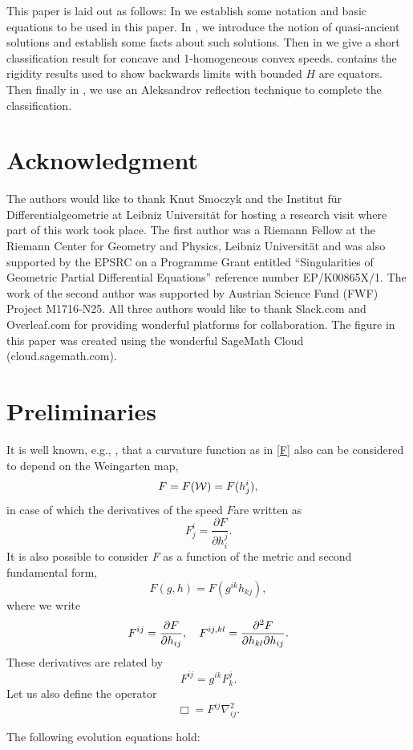 \documentclass{amsart}
\begin{document}
This paper is laid out as follows: In  we establish some notation and basic equations to be used in this paper. In , we introduce the notion of quasi-ancient solutions and establish some facts about such solutions. Then in  we give a short classification result for concave and 1-homogeneous convex speeds.  contains the rigidity results used to show backwards limits with bounded \(H\) are equators. Then finally in , we use an Aleksandrov reflection technique to complete the classification.

\section*{Acknowledgment}
The authors would like to thank Knut Smoczyk and the Institut f\"{u}r Differentialgeometrie at Leibniz Universität for hosting a research visit where part of this work took place. The first author was a Riemann Fellow at the Riemann Center for Geometry and Physics, Leibniz Universit\"{a}t and was also supported by the EPSRC on a Programme Grant entitled ``Singularities of Geometric Partial Differential Equations'' reference number EP/K00865X/1. The work of the second author was supported by Austrian Science Fund (FWF) Project M1716-N25. All three authors would like to thank Slack.com and Overleaf.com for providing wonderful platforms for collaboration. The figure in this paper was created using the wonderful SageMath Cloud (cloud.sagemath.com).

\section{Preliminaries}\label{prelim}
\label{sec:prelim}
It is well known, e.g., \cite[Chapter 2]{Gerhardt:/2006}, that a curvature function as in \cref{F} also can be considered to depend on the Weingarten map,
\[F=F(\mathcal{W})=F(h^i_j),\]
in case of which the derivatives of the speed \(F\)are written as
\[
F^{i}_{j} = \frac{\partial F}{\partial h^{j}_{i}}.
\]
It is also possible to consider $F$ as a function of the metric and second fundamental form,
\[
F(g, h) = F(g^{ik} h_{kj}),
\]
where we write
\[
F^{ij} = \frac{\partial F}{\partial h_{ij}}, \quad F^{ij,kl} = \frac{\partial^2F}{\partial h_{kl} \partial h_{ij}}.
\]
These derivatives are related by
\[F^{ij}=g^{ik}F^j_k.\]
Let us also define the operator
\[
\Box = F^{ij} \nabla^2_{ij}.
\]
\begin{lemma} \label{lem: basi ev}
The following evolution equations hold:
\end{lemma}
\end{document}
